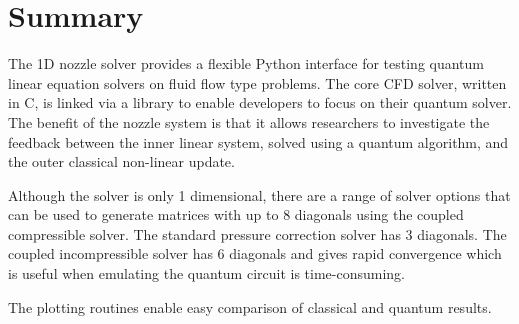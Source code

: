%
\section{Summary}
\label{sec-summary}

The 1D nozzle solver provides a flexible Python interface for testing quantum linear equation
solvers on fluid flow type problems.
The core CFD solver, written in C, is linked via a library to enable developers to focus on their
quantum solver.
The benefit of the nozzle system is that it allows researchers to investigate the feedback between the 
inner linear system, solved using a quantum algorithm, and the outer classical non-linear update.

Although the solver is only 1 dimensional, there are a range of solver options that can be
used to generate matrices with up to 8 diagonals using the coupled compressible solver. The standard
pressure correction solver has 3 diagonals. The coupled incompressible solver has 6 diagonals and
gives rapid convergence which is useful when emulating the quantum circuit is time-consuming.

The plotting routines enable easy comparison of classical and quantum results.
